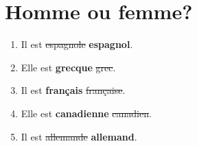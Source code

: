 \section{Homme ou femme?}
\begin{enumerate}
    \item Il est \sout{espagnole} \textbf{espagnol}.
    \item Elle est \textbf{grecque} \sout{grec}.
    \item Il est \textbf{français} \sout{française}.
    \item Elle est \textbf{canadienne} \sout{canadien}.
    \item Il est \sout{allemande} \textbf{allemand}.
\end{enumerate}
